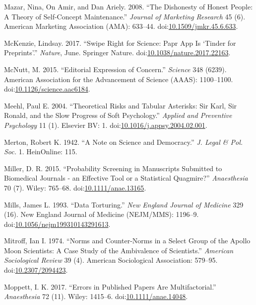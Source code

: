 \documentclass[a5paper]{book}
\begin{document}
\hypertarget{ref-doi:10.1509ux2fjmkr.45.6.633}{}
Mazar, Nina, On Amir, and Dan Ariely. 2008. ``The Dishonesty of Honest
People: A Theory of Self-Concept Maintenance.'' \emph{Journal of
Marketing Research} 45 (6). American Marketing Association (AMA):
633--44.
doi:\href{https://doi.org/10.1509/jmkr.45.6.633}{10.1509/jmkr.45.6.633}.

\hypertarget{ref-doi:10.1038ux2fnature.2017.22163}{}
McKenzie, Lindsay. 2017. ``Swipe Right for Science: Papr App Is `Tinder
for Preprints'.'' \emph{Nature}, June. Springer Nature.
doi:\href{https://doi.org/10.1038/nature.2017.22163}{10.1038/nature.2017.22163}.

\hypertarget{ref-doi:10.1126ux2fscience.aac6184}{}
McNutt, M. 2015. ``Editorial Expression of Concern.'' \emph{Science} 348
(6239). American Association for the Advancement of Science (AAAS):
1100--1100.
doi:\href{https://doi.org/10.1126/science.aac6184}{10.1126/science.aac6184}.

\hypertarget{ref-doi:10.1016ux2fj.appsy.2004.02.001}{}
Meehl, Paul E. 2004. ``Theoretical Risks and Tabular Asterisks: Sir
Karl, Sir Ronald, and the Slow Progress of Soft Psychology.''
\emph{Applied and Preventive Psychology} 11 (1). Elsevier BV: 1.
doi:\href{https://doi.org/10.1016/j.appsy.2004.02.001}{10.1016/j.appsy.2004.02.001}.

\hypertarget{ref-merton1942}{}
Merton, Robert K. 1942. ``A Note on Science and Democracy.'' \emph{J.
Legal \& Pol. Soc.} 1. HeinOnline: 115.

\hypertarget{ref-doi:10.1111ux2fanae.13165}{}
Miller, D. R. 2015. ``Probability Screening in Manuscripts Submitted to
Biomedical Journals - an Effective Tool or a Statistical Quagmire?''
\emph{Anaesthesia} 70 (7). Wiley: 765--68.
doi:\href{https://doi.org/10.1111/anae.13165}{10.1111/anae.13165}.

\hypertarget{ref-doi:10.1056ux2fnejm199310143291613}{}
Mills, James L. 1993. ``Data Torturing.'' \emph{New England Journal of
Medicine} 329 (16). New England Journal of Medicine (NEJM/MMS): 1196--9.
doi:\href{https://doi.org/10.1056/nejm199310143291613}{10.1056/nejm199310143291613}.

\hypertarget{ref-doi:10.2307ux2f2094423}{}
Mitroff, Ian I. 1974. ``Norms and Counter-Norms in a Select Group of the
Apollo Moon Scientists: A Case Study of the Ambivalence of Scientists.''
\emph{American Sociological Review} 39 (4). American Sociological
Association: 579--95.
doi:\href{https://doi.org/10.2307/2094423}{10.2307/2094423}.

\hypertarget{ref-doi:10.1111ux2fanae.14048}{}
Moppett, I. K. 2017. ``Errors in Published Papers Are Multifactorial.''
\emph{Anaesthesia} 72 (11). Wiley: 1415--6.
doi:\href{https://doi.org/10.1111/anae.14048}{10.1111/anae.14048}.
\end{document}
